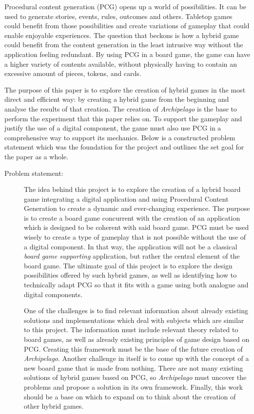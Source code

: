 Procedural content generation (PCG) opens up a world of possibilities. It can be used to generate stories, events, rules, outcomes and others. Tabletop games could benefit from those possibilities and create variations of gameplay that could enable enjoyable experiences. The question that beckons is how a hybrid game could benefit from the content generation in the least intrusive way without the application feeling redundant. By using PCG in a board game, the game can have a higher variety of contents available, without physically having to contain an excessive amount of pieces, tokens, and cards. 

The purpose of this paper is to explore the creation of hybrid games in the most direct and efficient way: by creating a hybrid game from the beginning and analyse the results of that creation. The creation of \textit{Archipelago} is the base to perform the experiment that this paper relies on. To support the gameplay and justify the use of a digital component, the game must also use PCG in a comprehensive way to support its mechanics. Below is a constructed problem statement which was the foundation for the project and outlines the set goal for the paper as a whole.

\begin{description}
\item[Problem statement:]

The idea behind this project is to explore the creation of a hybrid board game integrating a digital application and using Procedural Content Generation to create a dynamic and ever-changing experience. The purpose is to create a board game concurrent with the creation of an application which is designed to be coherent with said board game. PCG must be used wisely to create a type of gameplay that is not possible without the use of a digital component. In that way, the application will not be a classical \textit{board game supporting} application, but rather the central element of the board game. The ultimate goal of this project is to explore the design possibilities offered by such hybrid games, as well as identifying how to technically adapt PCG so that it fits with a game using both analogue and digital components.

One of the challenges is to find relevant information about already existing solutions and implementations which deal with subjects which are similar to this project. The information must include relevant theory related to board games, as well as already existing principles of game design based on PCG. Creating this framework must be the base of the future creation of \textit{Archipelago}. Another challenge in itself is to come up with the concept of a new board game that is made from nothing. There are not many existing solutions of hybrid games based on PCG, so \textit{Archipelago} must uncover the problems and propose a solution in its own framework. Finally, this work should be a base on which to expand on to think about the creation of other hybrid games. 
\end{description}

